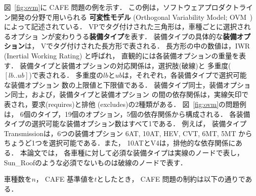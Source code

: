 
図~\ref{fig:ovm}に CAFE 問題の例を示す．
この例は，ソフトウェアプロダクトライン開発の分野で用いられる
\textbf{可変性モデル} (Orthogonal Variability Model; OVM~\cite{Pohl05:sple})
によって記述されている．
%
\textsf{VP}でタグ付けされた三角形は，車種ごとに選択されるオプショ
ンが変わりうる\textbf{装備タイプ}を表す．
装備タイプの具体的な\textbf{装備オプション}は，
\textsf{V}でタグ付けされた長方形で表される．
長方形の中の数値は，IWR (Inertial Working Rating) と呼ばれ，
直観的には各装備オプションの重量を表す．
装備タイプと装備オプションの対応関係は，選択肢(破線)と
多重度($[lb..ub]$)で表される．
多重度の$lb$と$ub$は，それぞれ，各装備タイプで選択可能な装備オプション
数の上限値と下限値である．
装備タイプ同士，装備オプション同士，および，装備タイプと装備オプション
の間の依存関係は，実線矢印で表され，要求(\textsf{requires})と排他
(\textsf{excludes})の2種類がある．
%
図~\ref{fig:ovm}の問題例は，
6個のタイプ，19個のオプション，5個の依存関係から構成される．
各装備タイプの選択可能な装備オプション数はすべて1である．
例えば，
装備タイプ\textsf{Transmission}は，6つの装備オプション
\textsf{6AT},
\textsf{10AT},
\textsf{HEV},
\textsf{CVT},
\textsf{6MT},
\textsf{5MT}
からちょうど1つを選択可能である．また，
\textsf{10AT}と\textsf{V4}は，排他的な依存関係にある．
%
本論文では，
各車種に対して必須な装備タイプは実線のノードで表し，
\textsf{Sun\_Roof}のような必須でないものは破線のノードで表す．

車種数を$n$，
CAFE 基準値を$t$としたとき，
CAFE 問題の制約は以下の通りである．

